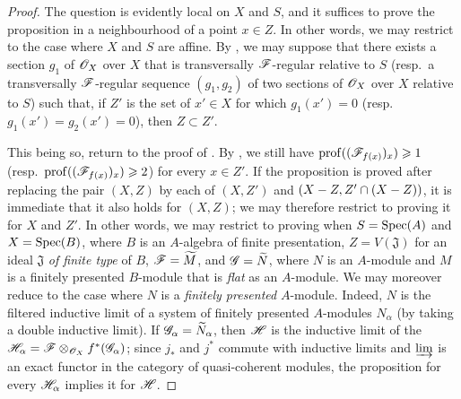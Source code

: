 \begin{proof}
The question is evidently local on $X$ and $S$, and it suffices to prove the proposition in a neighbourhood of a point $x\in Z$. In other words, we may restrict to the case where $X$ and $S$ are affine. By , we may suppose that there exists a section $g_1$ of $\mathscr{O}_X$ over $X$ that is transversally $\mathscr{F}$-regular relative to $S$ (resp.\ a transversally $\mathscr{F}$-regular sequence $(g_1,g_2)$ of two sections of $\mathscr{O}_X$ over $X$ relative to $S$) such that, if $Z'$ is the set of $x'\in X$ for which $g_1(x')=0$ (resp.\ $g_1(x')=g_2(x')=0$), then $Z\subset Z'$.

This being so, return to the proof of . By , we still have $\operatorname{prof}((\mathscr{F}_{f(x)})_x)\geqslant 1$ (resp.\ $\operatorname{prof}((\mathscr{F}_{f(x)})_x)\geqslant 2$) for every $x\in Z'$. If the proposition is proved after replacing the pair $(X,Z)$ by each of $(X,Z')$ and $(X- Z,Z'\cap(X- Z))$, it is immediate that it also holds for $(X,Z)$; we may therefore restrict to proving it for $X$ and $Z'$. In other words, we may restrict to proving  when $S=\operatorname{Spec}(A)$ and $X=\operatorname{Spec}(B)$, where $B$ is an $A$-algebra of finite presentation, $Z=V(\mathfrak{J})$ for an ideal $\mathfrak{J}$ \emph{of finite type} of $B$, $\mathscr{F}=\widetilde M$, and $\mathscr{G}=\widetilde N$, where $N$ is an $A$-module and $M$ is a finitely presented $B$-module that is \emph{flat} as an $A$-module. We may moreover reduce to the case where $N$ is a \emph{finitely presented} $A$-module. Indeed, $N$ is the filtered inductive limit of a system of finitely presented $A$-modules $N_\alpha$ (by taking a double inductive limit). If $\mathscr{G}_\alpha=\widetilde{N}_\alpha$, then $\mathscr{H}$ is the inductive limit of the $\mathscr{H}_\alpha=\mathscr{F}\otimes_{\mathscr{O}_X}f^*(\mathscr{G}_\alpha)$; since $j_*$ and $j^*$ commute with inductive limits and $\varinjlim$ is an exact functor in the category of quasi-coherent modules, the proposition for every $\mathscr{H}_\alpha$ implies it for $\mathscr{H}$.


\end{proof}
